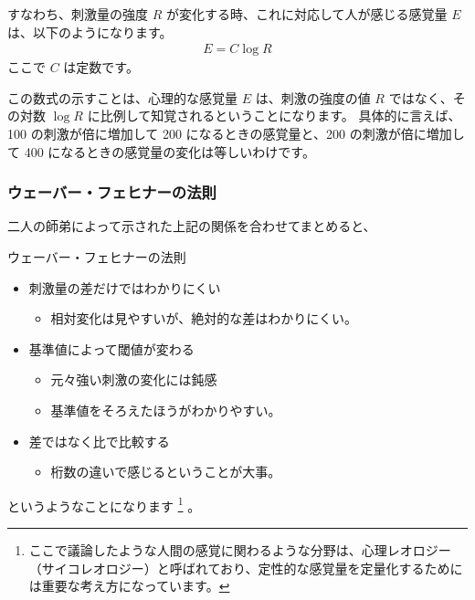 \documentclass[uplatex,dvipdfmx,a4paper,11pt]{jsreport}
\begin{document}
すなわち、刺激量の強度 $R$ が変化する時、これに対応して人が感じる感覚量 $E$ は、以下のようになります。
\begin{align*}
	E = C \log R
\end{align*}
ここで $C$ は定数です。

この数式の示すことは、心理的な感覚量 $E$ は、刺激の強度の値 $R$ ではなく、その対数 $\log R $ に比例して知覚されるということになります。
具体的に言えば、100 の刺激が倍に増加して 200 になるときの感覚量と、200 の刺激が倍に増加して 400 になるときの感覚量の変化は等しいわけです。

\subsubsection{ウェーバー・フェヒナーの法則}

二人の師弟によって示された上記の関係を合わせてまとめると、
\large
	\begin{itembox}[l]{ウェーバー・フェヒナーの法則}
		\begin{itemize}
			\item 刺激量の差だけではわかりにくい
			\begin{itemize}
				\item 相対変化は見やすいが、絶対的な差はわかりにくい。
			\end{itemize}
			\item 基準値によって閾値が変わる
			\begin{itemize}
				\item 元々強い刺激の変化には鈍感
				\item 基準値をそろえたほうがわかりやすい。
			\end{itemize}
			\item 差ではなく比で比較する
			\begin{itemize}
				\item 桁数の違いで感じるということが大事。
			\end{itemize}
		\end{itemize}
	\end{itembox}
\normalsize
というようなことになります
\footnote{
	ここで議論したような人間の感覚に関わるような分野は、心理レオロジー（サイコレオロジー）と呼ばれており、定性的な感覚量を定量化するためには重要な考え方になっています。
}
。
\end{document}
